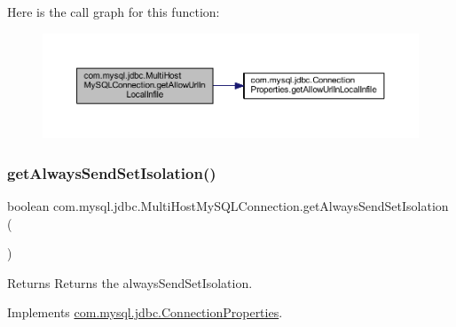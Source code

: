 Here is the call graph for this function\+:
\nopagebreak
\begin{figure}[H]
\begin{center}
\leavevmode
\includegraphics[width=350pt]{classcom_1_1mysql_1_1jdbc_1_1_multi_host_my_s_q_l_connection_a53db1b48cd5ab66d570f369452f7295a_cgraph}
\end{center}
\end{figure}
\mbox{\label{classcom_1_1mysql_1_1jdbc_1_1_multi_host_my_s_q_l_connection_afdb9d1814ebb8c261112e3c959aaf10b}} 
\subsubsection{\texorpdfstring{get\+Always\+Send\+Set\+Isolation()}{getAlwaysSendSetIsolation()}}
{\footnotesize\ttfamily boolean com.\+mysql.\+jdbc.\+Multi\+Host\+My\+S\+Q\+L\+Connection.\+get\+Always\+Send\+Set\+Isolation (\begin{DoxyParamCaption}{ }\end{DoxyParamCaption})}

\begin{DoxyReturn}{Returns}
Returns the always\+Send\+Set\+Isolation. 
\end{DoxyReturn}


Implements \mbox{\hyperlink{interfacecom_1_1mysql_1_1jdbc_1_1_connection_properties_a157a33612cbef9f88801ad8f2a4209b4}{com.\+mysql.\+jdbc.\+Connection\+Properties}}.

